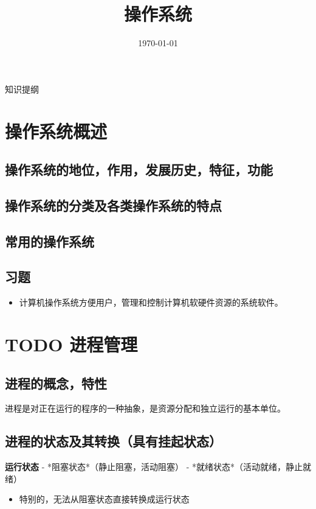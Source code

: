 \documentclass[11pt]{article}
\date{\today}
\title{操作系统}
\begin{document}
\maketitle
\tableofcontents

知识提纲
\section{操作系统概述}
\label{sec-1}
\subsection{操作系统的地位，作用，发展历史，特征，功能}
\label{sec-1-1}
\subsection{操作系统的分类及各类操作系统的特点}
\label{sec-1-2}
\subsection{常用的操作系统}
\label{sec-1-3}
\subsection{习题}
\label{sec-1-4}
\begin{itemize}
\item 计算机操作系统方便用户，管理和控制计算机软硬件资源的系统软件。
\end{itemize}
\section{{\bfseries\sffamily TODO} 进程管理}
\label{sec-2}
\subsection{进程的概念，特性}
\label{sec-2-1}
进程是对正在运行的程序的一种抽象，是资源分配和独立运行的基本单位。
\subsection{进程的状态及其转换（具有挂起状态）}
\label{sec-2-2}
\textbf{运行状态} - *阻塞状态*（静止阻塞，活动阻塞） - *就绪状态*（活动就绪，静止就绪）
\begin{itemize}
\item 特别的，无法从阻塞状态直接转换成运行状态
\end{itemize}
\end{document}
